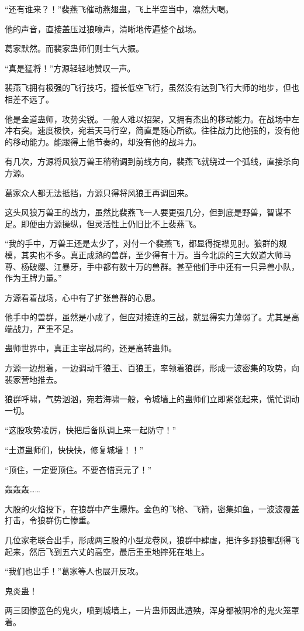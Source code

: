 \begin{this_body}
“还有谁来？！”裴燕飞催动燕翅蛊，飞上半空当中，凛然大喝。

他的声音，直接盖压过狼嚎声，清晰地传遍整个战场。

葛家默然。而裴家蛊师们则士气大振。

“真是猛将！”方源轻轻地赞叹一声。

裴燕飞拥有极强的飞行技巧，擅长低空飞行，虽然没有达到飞行大师的地步，但也相差不远了。

他是金道蛊师，攻势尖锐。一般人难以招架，又拥有杰出的移动能力。在战场中左冲右突。速度极快，宛若天马行空，简直是随心所欲。往往战力比他强的，没有他的移动能力。能跟得上他节奏的，却没有他的战斗力。

有几次，方源将风狼万兽王稍稍调到前线方向，裴燕飞就绕过一个弧线，直接杀向方源。

葛家众人都无法抵挡，方源只得将风狼王再调回来。

这头风狼万兽王的战力，虽然比裴燕飞一人要更强几分，但到底是野兽，智谋不足。即便由方源操纵，但灵活性上仍旧比不上裴燕飞。

“我的手中，万兽王还是太少了，对付一个裴燕飞，都显得捉襟见肘。狼群的规模，其实也不多。真正成熟的兽群，至少得有十万。当今北原的三大奴道大师马尊、杨破缨、江暴牙，手中都有数十万的兽群。甚至他们手中还有一只异兽小队，作为王牌力量。”

方源看着战场，心中有了扩张兽群的心思。

他手中的兽群，虽然是小成了，但应对接连的三战，就显得实力薄弱了。尤其是高端战力，严重不足。

蛊师世界中，真正主宰战局的，还是高转蛊师。

方源一边想着，一边调动千狼王、百狼王，率领着狼群，形成一波密集的攻势，向裴家营地推去。

狼群呼啸，气势汹汹，宛若海啸一般，令城墙上的蛊师们立即紧张起来，慌忙调动一切。

“这股攻势凌厉，快把后备队调上来一起防守！”

“土道蛊师们，快快快，修复城墙！！”

“顶住，一定要顶住。不要吝惜真元了！”

轰轰轰……

大股的火焰投下，在狼群中产生爆炸。金色的飞枪、飞箭，密集如鱼，一波波覆盖打击，令狼群伤亡惨重。

几位家老联合出手，形成两三股的小型龙卷风，狼群中肆虐，把许多野狼都刮得飞起来，然后飞到五六丈的高空，最后重重地摔死在地上。

“我们也出手！”葛家等人也展开反攻。

鬼炎蛊！

两三团惨蓝色的鬼火，喷到城墙上，一片蛊师因此遭殃，浑身都被阴冷的鬼火笼罩着。


\end{this_body}
